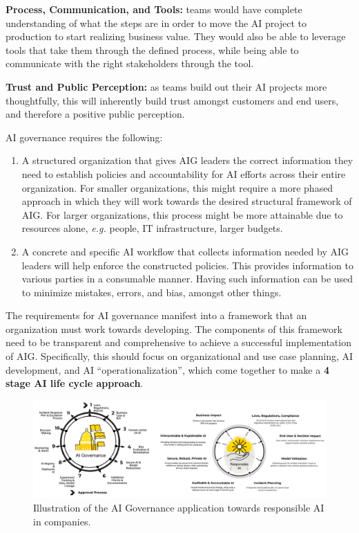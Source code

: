 \documentclass{article}
\begin{document}
\textbf{Process, Communication, and Tools:} teams would have complete understanding of what the steps are in order to move the AI project to production to start realizing business value. They would also be able to leverage tools that take them through the defined process, while being able to communicate with the right stakeholders through the tool.

\textbf{Trust and Public Perception:} as teams build out their AI projects more thoughtfully, this will inherently build trust amongst customers and end users, and therefore a positive public perception.

AI governance requires the following: 

\begin{enumerate}
\item A structured organization that gives AIG leaders the correct information they need to establish policies and accountability for AI efforts across their entire organization. For smaller organizations, this might require a more phased approach in which they will work towards the desired structural framework of AIG. For larger organizations, this process might be more attainable due to resources alone, \emph{e.g.} people, IT infrastructure, larger budgets.

\item A concrete and specific AI workflow that collects information needed by AIG leaders will help enforce the constructed policies. This provides information to various parties in a consumable manner. Having such information can be used to minimize mistakes, errors, and bias, amongst other things.
\end{enumerate}


The requirements for AI governance manifest into a framework that an organization must work towards developing. The components of this framework need to be transparent and comprehensive to achieve a successful implementation of AIG. Specifically, this should focus on organizational and use case planning, AI development, and AI ``operationalization'', which come together to make a \textbf{4 stage AI life cycle approach}.

\begin{figure}[b]
    \centering
    \includegraphics[width=\linewidth]{figures/aigov-1.pdf}
    \caption{Illustration of the AI Governance application towards responsible AI in companies.}
    \label{fig:teaser}
\end{figure}
\end{document}
